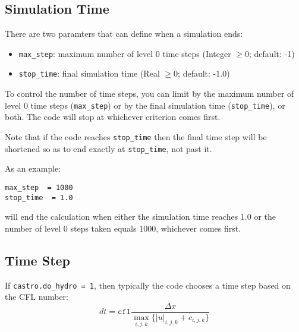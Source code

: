 \subsection{Simulation Time}

There are two paramters that can define when a simulation ends:
\begin{itemize}
\item {\tt max\_step}: maximum number of level 0 time steps (Integer $\geq 0$; default: -1)
\item {\tt stop\_time}: final simulation time (Real $\geq 0$;  default: -1.0)
\end{itemize}
To control the number of time steps, you can limit by the maximum
number of level 0 time steps ({\tt max\_step}) or by the final
simulation time ({\tt stop\_time}), or both. The code will stop at
whichever criterion comes first.

Note that if the code reaches {\tt stop\_time} then the final time
step will be shortened so as to end exactly at {\tt stop\_time}, not
past it.

As an example: 
\begin{lstlisting}
max_step  = 1000
stop_time  = 1.0
\end{lstlisting}
will end the calculation when either the simulation time reaches 1.0 or 
the number of level 0 steps taken equals 1000, whichever comes first.


\subsection{Time Step}
If {\tt castro.do\_hydro = 1}, then typically 
the code chooses a time step based on the CFL number:
\begin{equation}
dt = \mathtt{cfl} \frac{\Delta x}{\max_{i,j,k}\{|u|_{i,j,k}+c_{i,j,k}\}}
\label{eq:cfl}
\end{equation}

